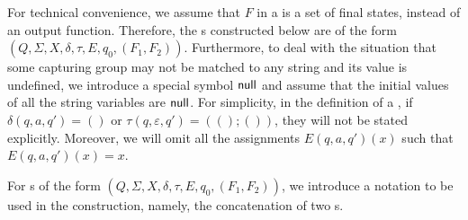 For technical convenience, we assume that $F$ in a {\PSST} is a set of final states, instead of an output function. Therefore, the {\PSST}s constructed below are of the form $(Q, \Sigma, X, \delta, \tau, E, q_0, (F_1, F_2))$. 
%
Furthermore, to deal with the situation that some capturing group may not be matched to any string and its value is undefined, we introduce a special symbol $\mathsf{null}$ %
and assume that the initial values of all the string variables are $\mathsf{null}$. %
For simplicity, in the definition of a {\PSST}, if $\delta(q, a, q') = ()$ or $\tau(q, \varepsilon, q') = ((); ())$,  they will not be stated explicitly. Moreover, we will omit all the assignments $E(q, a, q')(x)$ such that $E(q, a, q')(x) = x$.

For {\PSST}s of the form $(Q, \Sigma, X, \delta, \tau, E, q_0, (F_1, F_2))$, we introduce a notation to be used in the construction, namely, the concatenation of two {\PSST}s. 

